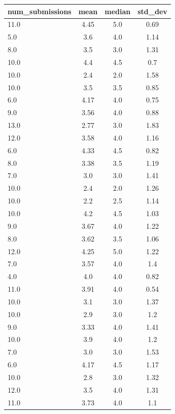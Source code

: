 \begin{table}[htbp]
    \scriptsize
    \hspace*{-2.2cm}
    \begin{tabularx}{1.3\textwidth}{|X|c|c|c|}
        \hline
        num_submissions & mean & median & std_dev \\
        \hline
        11.0 & 4.45 & 5.0 & 0.69 \\
        5.0 & 3.6 & 4.0 & 1.14 \\
        8.0 & 3.5 & 3.0 & 1.31 \\
        10.0 & 4.4 & 4.5 & 0.7 \\
        10.0 & 2.4 & 2.0 & 1.58 \\
        10.0 & 3.5 & 3.5 & 0.85 \\
        6.0 & 4.17 & 4.0 & 0.75 \\
        9.0 & 3.56 & 4.0 & 0.88 \\
        13.0 & 2.77 & 3.0 & 1.83 \\
        12.0 & 3.58 & 4.0 & 1.16 \\
        6.0 & 4.33 & 4.5 & 0.82 \\
        8.0 & 3.38 & 3.5 & 1.19 \\
        7.0 & 3.0 & 3.0 & 1.41 \\
        10.0 & 2.4 & 2.0 & 1.26 \\
        10.0 & 2.2 & 2.5 & 1.14 \\
        10.0 & 4.2 & 4.5 & 1.03 \\
        9.0 & 3.67 & 4.0 & 1.22 \\
        8.0 & 3.62 & 3.5 & 1.06 \\
        12.0 & 4.25 & 5.0 & 1.22 \\
        7.0 & 3.57 & 4.0 & 1.4 \\
        4.0 & 4.0 & 4.0 & 0.82 \\
        11.0 & 3.91 & 4.0 & 0.54 \\
        10.0 & 3.1 & 3.0 & 1.37 \\
        10.0 & 2.9 & 3.0 & 1.2 \\
        9.0 & 3.33 & 4.0 & 1.41 \\
        10.0 & 3.9 & 4.0 & 1.2 \\
        7.0 & 3.0 & 3.0 & 1.53 \\
        6.0 & 4.17 & 4.5 & 1.17 \\
        10.0 & 2.8 & 3.0 & 1.32 \\
        12.0 & 3.5 & 4.0 & 1.31 \\
        11.0 & 3.73 & 4.0 & 1.1 \\

\end{tabularx}
\end{table}
